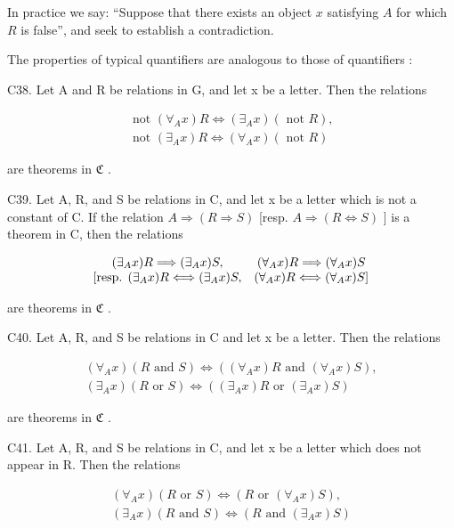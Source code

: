 In practice we say: ``Suppose that there exists an object \(x\) satisfying \(A\) for which \(R\) is false'', and seek to establish a contradiction.

The properties of typical quantifiers are analogous to those of quantifiers :

C38. Let A and R be relations in G, and let x be a letter. Then the relations

\[
\begin{array}{l} \text { not } (\forall_ {A} x) R \Longleftrightarrow (\exists_ {A} x) (\text { not } R), \\ \text { not } (\exists_ {A} x) R \Longleftrightarrow (\forall_ {A} x) (\text { not } R) \end{array}
\]

are theorems in \(\mathfrak{C}\) .

C39. Let A, R, and S be relations in C, and let x be a letter which is not a constant of C. If the relation \(A \Longrightarrow (R \Longrightarrow S)\) {[}resp. \(A \Longrightarrow (R \Longleftrightarrow S)\) {]} is a theorem in C, then the relations

\[
\begin{array}{c c} (\exists_ {A} x) R \Longrightarrow (\exists_ {A} x) S, & (\forall_ {A} x) R \Longrightarrow (\forall_ {A} x) S \\ \text{[resp. } (\exists_ {A} x) R \Longleftrightarrow (\exists_ {A} x) S, & (\forall_ {A} x) R \Longleftrightarrow (\forall_ {A} x) S \text{]} \end{array}
\]

are theorems in \(\mathfrak{C}\) .

C40. Let A, R, and S be relations in C and let x be a letter. Then the relations

\[
\begin{array}{c} (\forall_ {A} x) (R \text {   and   } S) \iff ((\forall_ {A} x) R \text {   and   } (\forall_ {A} x) S), \\ (\exists_ {A} x) (R \text {   or   } S) \iff ((\exists_ {A} x) R \text {   or   } (\exists_ {A} x) S) \end{array}
\]

are theorems in \(\mathfrak{C}\) .

C41. Let A, R, and S be relations in C, and let x be a letter which does not appear in R. Then the relations

\[
\begin{array}{l} (\forall_ {A} x) (R \text {   or   } S) \iff (R \text {   or   } (\forall_ {A} x) S), \\ (\exists_ {A} x) (R \text {   and   } S) \iff (R \text {   and   } (\exists_ {A} x) S) \end{array}
\]


